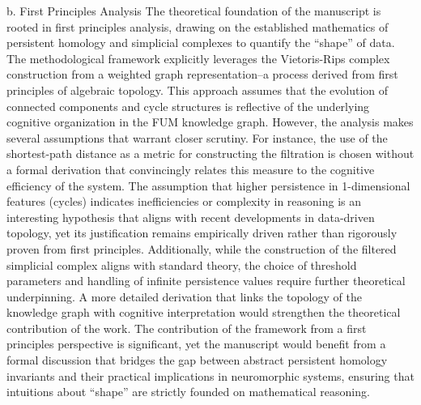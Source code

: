 \documentclass{article}
\begin{document}
b. First Principles Analysis  
The theoretical foundation of the manuscript is rooted in first principles analysis, drawing on the established mathematics of persistent homology and simplicial complexes to quantify the “shape” of data. The methodological framework explicitly leverages the Vietoris-Rips complex construction from a weighted graph representation--a process derived from first principles of algebraic topology. This approach assumes that the evolution of connected components and cycle structures is reflective of the underlying cognitive organization in the FUM knowledge graph. However, the analysis makes several assumptions that warrant closer scrutiny. For instance, the use of the shortest-path distance as a metric for constructing the filtration is chosen without a formal derivation that convincingly relates this measure to the cognitive efficiency of the system. The assumption that higher persistence in 1-dimensional features (cycles) indicates inefficiencies or complexity in reasoning is an interesting hypothesis that aligns with recent developments in data-driven topology, yet its justification remains empirically driven rather than rigorously proven from first principles. Additionally, while the construction of the filtered simplicial complex aligns with standard theory, the choice of threshold parameters and handling of infinite persistence values require further theoretical underpinning. A more detailed derivation that links the topology of the knowledge graph with cognitive interpretation would strengthen the theoretical contribution of the work. The contribution of the framework from a first principles perspective is significant, yet the manuscript would benefit from a formal discussion that bridges the gap between abstract persistent homology invariants and their practical implications in neuromorphic systems, ensuring that intuitions about “shape” are strictly founded on mathematical reasoning.
\end{document}
